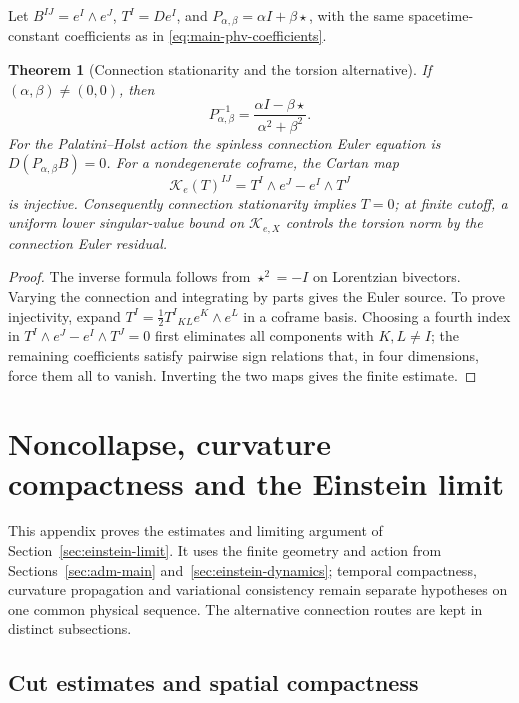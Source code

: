 \documentclass[11pt]{article}
\newtheorem{theorem}{Theorem}[section]
\numberwithin{equation}{section}
\theoremstyle{definition}
\theoremstyle{remark}
\begin{document}
Let $B^{IJ}=e^I\wedge e^J$, $T^I=De^I$, and
$P_{\alpha,\beta}=\alpha I+\beta\star$, with the same
spacetime-constant coefficients as in \eqref{eq:main-phv-coefficients}.

\begin{theorem}[Connection stationarity and the torsion alternative]
\label{thm:supp-palatini-torsion}
If $(\alpha,\beta)\ne(0,0)$, then
\begin{equation}
 P_{\alpha,\beta}^{-1}
 =\frac{\alpha I-\beta\star}{\alpha^2+\beta^2}.
 \label{eq:supp-palatini-inverse}
\end{equation}
For the Palatini--Holst action the spinless connection Euler equation is
$D(P_{\alpha,\beta}B)=0$.  For a nondegenerate coframe, the Cartan map
\[
 \mathcal K_e(T)^{IJ}=T^I\wedge e^J-e^I\wedge T^J
\]
is injective.  Consequently connection stationarity implies $T=0$; at finite
cutoff, a uniform lower singular-value bound on $\mathcal K_{e,X}$ controls the
torsion norm by the connection Euler residual.
\end{theorem}

\begin{proof}
The inverse formula follows from $\star^2=-I$ on Lorentzian bivectors.  Varying
the connection and integrating by parts gives the Euler source.  To prove
injectivity, expand $T^I=\frac12T^I{}_{KL}e^K\wedge e^L$ in a coframe basis.
Choosing a fourth index in
$T^I\wedge e^J-e^I\wedge T^J=0$ first eliminates all components with
$K,L\ne I$; the remaining coefficients satisfy pairwise sign relations that,
in four dimensions, force them all to vanish.  Inverting the two maps gives the
finite estimate.
\end{proof}


\section{Noncollapse, curvature compactness and the Einstein limit}
\label{supp:continuum}

This appendix proves the estimates and limiting argument of
Section~\ref{sec:einstein-limit}. It uses the finite geometry and action
from Sections~\ref{sec:adm-main} and~\ref{sec:einstein-dynamics}; temporal
compactness, curvature propagation and variational consistency remain
separate hypotheses on one common physical sequence. The alternative
connection routes are kept in distinct subsections.
\subsection{Cut estimates and spatial compactness}
\end{document}

